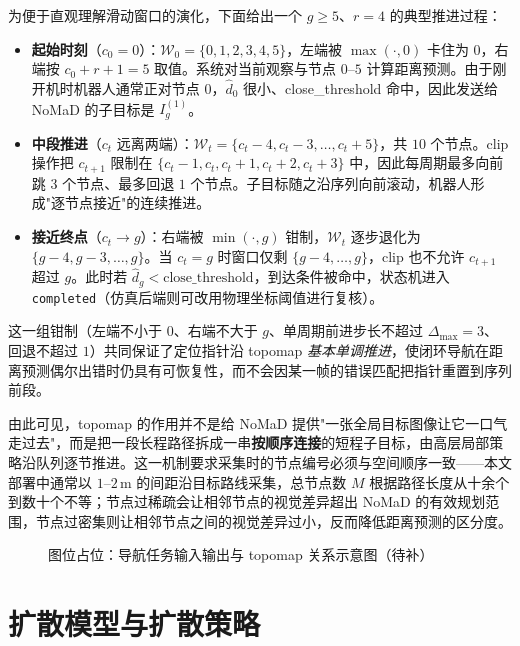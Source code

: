 为便于直观理解滑动窗口的演化，下面给出一个 $g\ge 5$、$r=4$ 的典型推进过程：
\begin{itemize}
    \item \textbf{起始时刻}（$c_0 = 0$）：$\mathcal{W}_0 = \{0,1,2,3,4,5\}$，左端被 $\max(\cdot,0)$ 卡住为 $0$，右端按 $c_0 + r + 1 = 5$ 取值。系统对当前观察与节点 $0$--$5$ 计算距离预测。由于刚开机时机器人通常正对节点 $0$，$\hat d_0$ 很小、close\_threshold 命中，因此发送给 NoMaD 的子目标是 $I_g^{(1)}$。
    \item \textbf{中段推进}（$c_t$ 远离两端）：$\mathcal{W}_t = \{c_t-4, c_t-3, \ldots, c_t+5\}$，共 $10$ 个节点。clip 操作把 $c_{t+1}$ 限制在 $\{c_t-1, c_t, c_t+1, c_t+2, c_t+3\}$ 中，因此每周期最多向前跳 $3$ 个节点、最多回退 $1$ 个节点。子目标随之沿序列向前滚动，机器人形成"逐节点接近"的连续推进。
    \item \textbf{接近终点}（$c_t \to g$）：右端被 $\min(\cdot, g)$ 钳制，$\mathcal{W}_t$ 逐步退化为 $\{g-4, g-3, \ldots, g\}$。当 $c_t = g$ 时窗口仅剩 $\{g-4, \ldots, g\}$，clip 也不允许 $c_{t+1}$ 超过 $g$。此时若 $\hat d_g < \text{close\_threshold}$，到达条件被命中，状态机进入 \texttt{completed}（仿真后端则可改用物理坐标阈值进行复核）。
\end{itemize}
这一组钳制（左端不小于 $0$、右端不大于 $g$、单周期前进步长不超过 $\Delta_{\max}=3$、回退不超过 $1$）共同保证了定位指针沿 topomap \emph{基本单调推进}，使闭环导航在距离预测偶尔出错时仍具有可恢复性，而不会因某一帧的错误匹配把指针重置到序列前段。

由此可见，topomap 的作用并不是给 NoMaD 提供"一张全局目标图像让它一口气走过去"，而是把一段长程路径拆成一串\textbf{按顺序连接}的短程子目标，由高层局部策略沿队列逐节推进。这一机制要求采集时的节点编号必须与空间顺序一致——本文部署中通常以 $1\text{--}2\,\text{m}$ 的间距沿目标路线采集，总节点数 $M$ 根据路径长度从十余个到数十个不等；节点过稀疏会让相邻节点的视觉差异超出 NoMaD 的有效规划范围，节点过密集则让相邻节点之间的视觉差异过小，反而降低距离预测的区分度。

\begin{figure}[htbp]
    \centering
    \fbox{\rule{0pt}{52mm}\rule{0.82\linewidth}{0pt}}
    \caption{图位占位：导航任务输入输出与 topomap 关系示意图（待补）}
    \label{fig:prelim-nav-pipeline-placeholder}
\end{figure}

\section{扩散模型与扩散策略}

